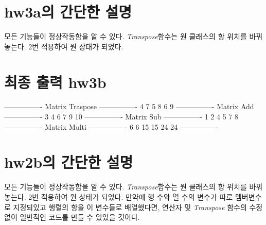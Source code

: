 \documentclass[a4paper,12pt]{article}
\begin{document}
\section{hw3a의 간단한 설명}
모든 기능들이 정상작동함을 알 수 있다. \textsl{Transpose}함수는 원 클래스의 항 위치를 바꿔놓는다. 2번 적용하여 원 상태가 되었다.


\section{최종 출력 hw3b}
----------------
\newline
Matrix Traspose
\newline
----------------
 4 7
 5 8
 6 9
\newline
----------------
\newline
Matrix Add
\newline
----------------
 3 4
 6 7
 9 10
\newline
----------------
\newline
Matrix Sub
\newline
----------------
 1 2
 4 5
 7 8
\newline
----------------
\newline
Matrix Multi
\newline
----------------
 6 6
 15 15
 24 24
\newline
----------------

\section{hw2b의 간단한 설명}
모든 기능들이 정상작동함을 알 수 있다. \textsl{Transpose}함수는 원 클래스의 항 위치를 바꿔놓는다. 2번 적용하여 원 상태가 되었다.
만약에 행 수와 열 수의 변수가 따로 멤버변수로 지정되있고 행렬의 항을 이 변수들로 배열했다면, 연산자 및 \textsl{Transpose} 함수의 수정 없이
일반적인 코드를 만들 수 있었을 것이다.
\end{document}
